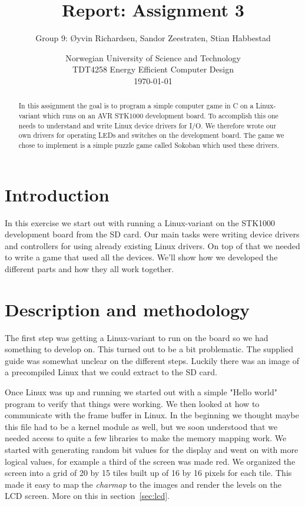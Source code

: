 \documentclass[a4paper,11pt]{article}
\title{\textbf{Report: Assignment 3}}
\author{Group 9: \O yvin Richardsen, Sandor Zeestraten, Stian Habbestad}
\date{{Norwegian University of Science and Technology \\
TDT4258 Energy Efficient Computer Design \\}
\today}
\begin{document}
\maketitle
\bigskip\bigskip\bigskip\bigskip\bigskip\bigskip\bigskip\bigskip\bigskip

\begin{abstract}
In this assignment the goal is to program a simple computer game in C on a Linux-variant which runs on an AVR STK1000 development board. To accomplish this one needs to understand and write Linux device drivers for I/O. We therefore wrote our own drivers for operating LEDs and switches on the development board. The game we chose to implement is a simple puzzle game called Sokoban which used these drivers.
\end{abstract}

\newpage
\tableofcontents
\newpage

\section{Introduction}
In this exercise we start out with running a Linux-variant on the STK1000 development board from the SD card. Our main tasks were writing device drivers and controllers for using already existing Linux drivers. On top of that we needed to write a game that used all the devices. We'll show how we developed the different parts and how they all work together.

\section{Description and methodology}
The first step was getting a Linux-variant to run on the board so we had something to develop on. This turned out to be a bit problematic. The supplied guide was somewhat unclear on the different steps. Luckily there was an image of a precompiled Linux that we could extract to the SD card. 

Once Linux was up and running we started out with a simple "Hello world" program to verify that things were working. We then looked at how to communicate with the frame buffer in Linux. In the beginning we thought maybe this file had to be a kernel module as well, but we soon understood that we needed access to quite a few libraries to make the memory mapping work. We started with generating random bit values for the display and went on with more logical values, for example a third of the screen was made red. We organized the screen into a grid of 20 by 15 tiles built up of 16 by 16 pixels for each tile. This made it easy to map the \textit{charmap} to the images and render the levels on the LCD screen. More on this in section~\ref{sec:lcd}.
\end{document}
